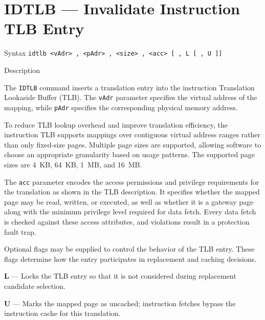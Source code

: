 %
%
\pagebreak
\section*{IDTLB — Invalidate Instruction TLB Entry}

\begin{iPageDescEntry}{Syntax}
\texttt{idtlb <vAdr> , <pAdr> , <size> , <acc> [ , L [ , U ]]}
\end{iPageDescEntry}

\begin{iPageDescEntry}{Description}

The \texttt{IDTLB} command inserts a translation entry into the instruction
Translation Lookaside Buffer (TLB). The \texttt{vAdr} parameter specifies the
virtual address of the mapping, while \texttt{pAdr} specifies the corresponding
physical memory address.

To reduce TLB lookup overhead and improve translation efficiency, the instruction
TLB supports mappings over contiguous virtual address ranges rather than only
fixed-size pages. Multiple page sizes are supported, allowing software to choose
an appropriate granularity based on usage patterns. The supported page sizes are
4~KB, 64~KB, 1~MB, and 16~MB.

The \texttt{acc} parameter encodes the access permissions and privilege
requirements for the translation as shown in the TLB description. It specifies whether the mapped page may be read, written, or executed, as well as whether it is a gateway page along with the minimum privilege level required for data fetch. Every data fetch is checked against these access attributes, and violations result in a protection fault trap.

Optional flags may be supplied to control the behavior of the TLB entry. These
flags determine how the entry participates in replacement and caching decisions.

\begin{smallGapItemize}
  \item \textbf{L} — Locks the TLB entry so that it is not considered during
        replacement candidate selection.
  \item \textbf{U} — Marks the mapped page as uncached; instruction fetches bypass
        the instruction cache for this translation.
\end{smallGapItemize}

\end{iPageDescEntry}

